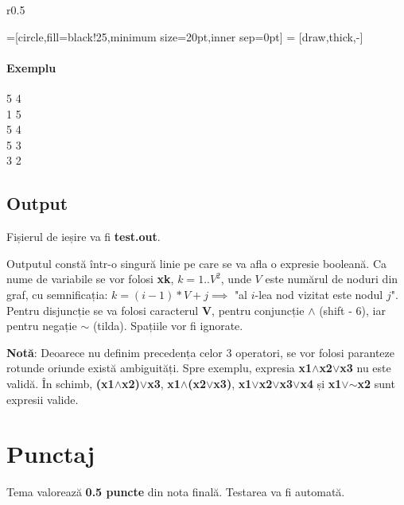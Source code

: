 \documentclass[12pt]{article}
\begin{document}
\begin{wrapfigure}{r}{0.5\textwidth}
  \raggedright
  =[circle,fill=black!25,minimum size=20pt,inner sep=0pt]
   = [draw,thick,-]

\end{wrapfigure}

\paragraph{Exemplu}\mbox{}\par
5 4\\
1 5\\
5 4\\
5 3\\
3 2

\subsection{Output}
Fișierul de ieșire va fi {\bf test.out}.

Outputul constă într-o singură linie pe care se va afla o expresie booleană.
Ca nume de variabile se vor folosi {\bf xk}, $k = 1..V^2$, unde $V$
este numărul de noduri din graf, cu semnificația: $k = (i - 1)*V + j \implies$
"al $i$-lea nod vizitat este nodul $j$".
Pentru disjuncție se va folosi caracterul {\bf V}, pentru conjuncție
{\bf $\wedge$} (shift - 6), iar pentru negație {\bf $\sim$} (tilda).
Spațiile vor fi ignorate.

{\bf Notă}: Deoarece nu definim precedența celor 3 operatori,
se vor folosi paranteze rotunde oriunde există ambiguități. Spre exemplu,
expresia {\bf x1$\wedge$x2$\vee$x3} nu este validă. În schimb,
{\bf (x1$\wedge$x2)$\vee$x3}, {\bf x1$\wedge$(x2$\vee$x3)},
{\bf x1$\vee$x2$\vee$x3$\vee$x4} și {\bf x1$\vee$$\sim$x2} sunt expresii valide.

\section{Punctaj}
Tema valorează {\bf 0.5 puncte} din nota finală. Testarea va fi automată.
\end{document}
